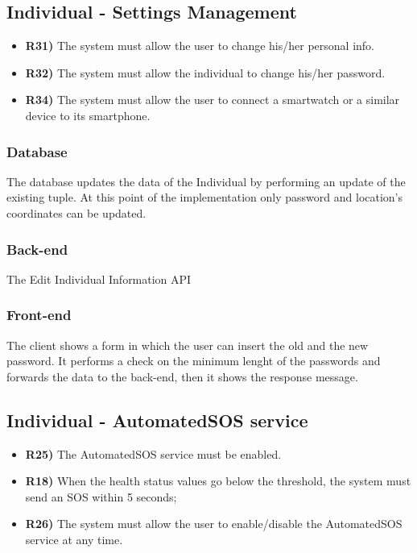 \subsection{Individual - Settings Management}
\begin{itemize}	
	\item {\color{Red}\textbf{R31)}} The system must allow the user to change his/her personal info.
	\item {\color{Green}\textbf{R32)}} The system must allow the individual to change his/her password.
	\item {\color{Red}\textbf{R34)}} The system must allow the user to connect a smartwatch or a similar device to its smartphone.
\end{itemize}
\subsubsection*{Database}
The database updates the data of the Individual by performing an update of the existing tuple. At this point of the implementation only password and location's coordinates can be updated. 

\subsubsection*{Back-end}
The Edit Individual Information API  %

\subsubsection*{Front-end}
The client shows a form in which the user can insert the old and the new password. It performs a check on the minimum lenght of the passwords and forwards the data to the back-end, then it shows the response message. %


\subsection{Individual - AutomatedSOS service}
\begin{itemize}	
	\item {\color{Green}\textbf{R25)}} The AutomatedSOS service must be enabled.
	\item {\color{Green}\textbf{R18)}} When the health status values go below the threshold, the system must send an SOS within 5 seconds;
	\item {\color{Green}\textbf{R26)}} The system must allow the user to enable/disable the AutomatedSOS service at any time.
\end{itemize}

